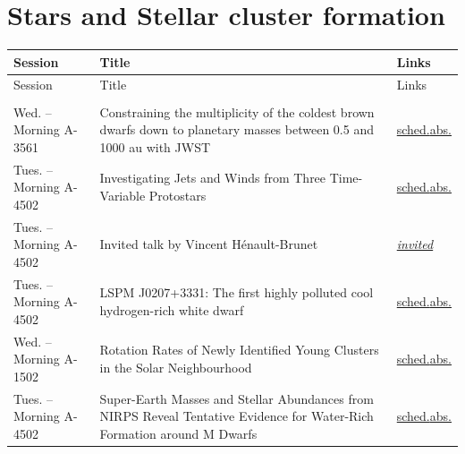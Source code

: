 \section*{Stars and Stellar cluster formation}
{\small
\setlength{\emergencystretch}{1em}
\begin{longtable}{@{}>{\TableRaggedRight\arraybackslash\hspace{0pt}}p{} >{\TableRaggedRight\arraybackslash\hspace{0pt}}p{} >{\TableRaggedRight\arraybackslash\hspace{0pt}}p{}@{}}
\toprule
Session & Title & Links \\
\midrule
\endfirsthead
\toprule
Session & Title & Links \\
\midrule
\endhead
\addlinespace[0.15em]
\multicolumn{3}{@{}l}{\sffamily\bfseries\color{cascateal} Talks} \\
\addlinespace[0.1em]
Wed. -- Morning A-3561 & Constraining the multiplicity of the coldest brown dwarfs down to planetary masses between 0.5 and 1000 au with JWST & \hyperlink{schedule-talk-233}{sched.}\newline \hyperlink{abstract-talk-233}{abs.} \\
Tues. -- Morning A-4502 & Investigating Jets and Winds from Three Time-Variable Protostars & \hyperlink{schedule-talk-76}{sched.}\newline \hyperlink{abstract-talk-76}{abs.} \\
Tues. -- Morning A-4502 & Invited talk by Vincent Hénault-Brunet & \hyperlink{invited-vincent-henault-brunet}{\textit{invited}} \\
Tues. -- Morning A-4502 & LSPM J0207+3331: The first highly polluted cool hydrogen-rich white dwarf & \hyperlink{schedule-talk-26}{sched.}\newline \hyperlink{abstract-talk-26}{abs.} \\
Wed. -- Morning A-1502 & Rotation Rates of Newly Identified Young Clusters in the Solar Neighbourhood & \hyperlink{schedule-talk-223}{sched.}\newline \hyperlink{abstract-talk-223}{abs.} \\
Tues. -- Morning A-4502 & Super-Earth Masses and Stellar Abundances from NIRPS Reveal Tentative Evidence for Water-Rich Formation around M Dwarfs & \hyperlink{schedule-talk-28}{sched.}\newline \hyperlink{abstract-talk-28}{abs.} \\

\end{longtable}}

